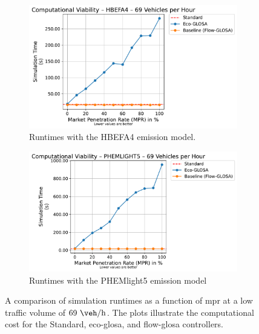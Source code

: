 \begin{figure}[htbp]
  \centering
  \begin{subfigure}[b]{0.98\textwidth}
    \includegraphics[width=\textwidth]{data/img/ComputationalViability/ComputationalViability_HBEFA4_Cars69.pdf}
    \caption{Runtimes with the HBEFA4 emission model.}
    \label{fig:Comp_69_HBEFA4}
  \end{subfigure}
  \begin{subfigure}[b]{0.98\textwidth}
    \includegraphics[width=\textwidth]{data/img/ComputationalViability/ComputationalViability_PHEMLIGHT5_Cars69.pdf}
    \caption{Runtimes with the PHEMlight5 emission model}
    \label{fig:Comp_69_PHEM}
  \end{subfigure}
  \caption[Computational Cost at Low Traffic Volume]{A comparison of simulation runtimes as a function of \ac{mpr} at a low traffic volume of $69~\unit{\veh\per\hour}$. The plots illustrate the computational cost for the Standard, \ac{eco-glosa}, and \ac{flow-glosa} controllers.}
  \label{fig:Comp_69}
\end{figure}

